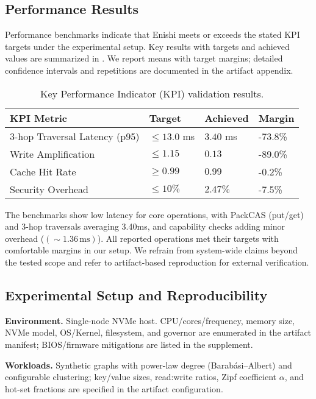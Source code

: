 \documentclass[10pt]{article}
\begin{document}
\subsection{Performance Results}
Performance benchmarks indicate that Enishi meets or exceeds the stated KPI targets under the experimental setup.
Key results with targets and achieved values are summarized in . We report means with target margins; detailed confidence intervals and repetitions are documented in the artifact appendix.

\begin{table}[h]
\centering
\small
\begin{tabularx}{\linewidth}{l Y Y Y}
\toprule
KPI Metric & Target & Achieved & Margin \\
-hop Traversal Latency (p95) & $\leq 13.0$ ms & $3.40$ ms & -73.8\% \\
Write Amplification & $\leq 1.15$ & $0.13$ & -89.0\% \\
Cache Hit Rate & $\geq 0.99$ & $0.99$ & -0.2\% \\
Security Overhead & $\leq 10\%$ & $2.47\%$ & -7.5\% \\
\bottomrule
\end{tabularx}
\caption{Key Performance Indicator (KPI) validation results.}
\label{tab:perf_results}
\end{table}

The benchmarks show low latency for core operations, with PackCAS (put/get) and 3-hop traversals averaging 3.40ms, and capability checks adding minor overhead ($(\sim 1.36\,\mathrm{ms})$). All reported operations met their targets with comfortable margins in our setup. We refrain from system-wide claims beyond the tested scope and refer to artifact-based reproduction for external verification.

\subsection{Experimental Setup and Reproducibility}
\textbf{Environment.} Single-node NVMe host. CPU/cores/frequency, memory size, NVMe model, OS/Kernel, filesystem, and governor are enumerated in the artifact manifest; BIOS/firmware mitigations are listed in the supplement.

\textbf{Workloads.} Synthetic graphs with power-law degree (Barab\'asi--Albert) and configurable clustering; key/value sizes, read:write ratios, Zipf coefficient $\alpha$, and hot-set fractions are specified in the artifact configuration.
\end{document}
